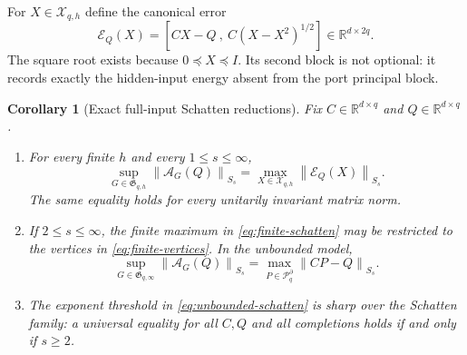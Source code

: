 \documentclass[journal,10pt]{IEEEtran}
\newtheorem{corollary}[theorem]{Corollary}
\theoremstyle{definition}
\theoremstyle{remark}
\newcommand{\R}{\mathbb R}
\newcommand{\cX}{\mathcal X}
\newcommand{\cP}{\mathcal P}
\newcommand{\cE}{\mathcal E}
\newcommand{\cA}{\mathcal A}
\newcommand{\fG}{\mathfrak G}
\newcommand{\norm}[1]{\left\lVert #1\right\rVert}
\begin{document}
For $X\in\cX_{q,h}$ define the canonical error
\begin{equation}
  \cE_Q(X)
  =\left[CX-Q\ ,\ C(X-X^2)^{1/2}\right]
  \in\R^{d\times2q}.
  \label{eq:canonical-error}
\end{equation}
The square root exists because $0\preceq X\preceq I$.  Its second block is
not optional: it records exactly the hidden-input energy absent from the port
principal block.

\begin{corollary}[Exact full-input Schatten reductions]
\label{cor:schatten}
Fix $C\in\R^{d\times q}$ and $Q\in\R^{d\times q}$.

\begin{enumerate}[label=\textup{(\roman*)},leftmargin=2.1em]
\item For every finite $h$ and every $1\leq s\leq\infty$,
\begin{equation}
  \sup_{G\in\fG_{q,h}}\norm{\cA_G(Q)}_{S_s}
  =\max_{X\in\cX_{q,h}}\norm{\cE_Q(X)}_{S_s}.
  \label{eq:finite-schatten}
\end{equation}
The same equality holds for every unitarily invariant matrix norm.

\item If $2\leq s\leq\infty$, the finite maximum in
\eqref{eq:finite-schatten} may be restricted to the vertices in
\eqref{eq:finite-vertices}.  In the unbounded model,
\begin{equation}
  \sup_{G\in\fG_{q,\infty}}\norm{\cA_G(Q)}_{S_s}
  =\max_{P\in\cP_q^\partial}\norm{CP-Q}_{S_s}.
  \label{eq:unbounded-schatten}
\end{equation}

\item The exponent threshold in \eqref{eq:unbounded-schatten} is sharp over
the Schatten family: a universal equality for all $C,Q$ and all completions
holds if and only if $s\geq2$.
\end{enumerate}
\end{corollary}
\end{document}
